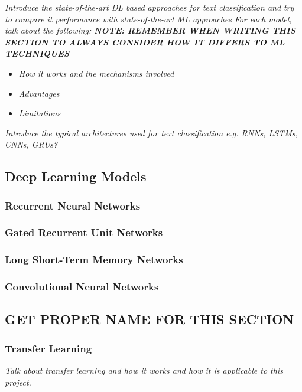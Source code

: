 \documentclass[a4paper,twoside,phd]{BYUPhys}
\begin{document}
\textit{Introduce the state-of-the-art DL based approaches for text classification and try to compare it performance with state-of-the-art ML approaches} \newline
\textit{For each model, talk about the following:}
\newline
\textbf{\textit{NOTE: REMEMBER WHEN WRITING THIS SECTION TO ALWAYS CONSIDER HOW IT DIFFERS TO ML TECHNIQUES}}
\begin{itemize}
	\item \textit{How it works and the mechanisms involved}
	\item \textit{Advantages}
	\item \textit{Limitations}
\end{itemize} 

\textit{Introduce the typical architectures used for text classification e.g. RNNs, LSTMs, CNNs, GRUs?}

\subsection{Deep Learning Models}
\label{sec:DLModels}

\subsubsection{Recurrent Neural Networks}
\label{sec:RNN}

\subsubsection{Gated Recurrent Unit Networks}
\label{sec:GRU}

\subsubsection{Long Short-Term Memory Networks}
\label{sec:LSTM}

\subsubsection{Convolutional Neural Networks}
\label{sec:CNN}

\subsection{GET PROPER NAME FOR THIS SECTION}
\subsubsection{Transfer Learning}
\label{sec:TransferLearningReview}
\textit{Talk about transfer learning and how it works and how it is applicable to this project.}
\end{document}
